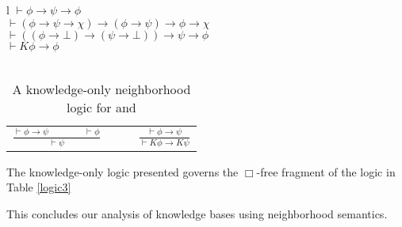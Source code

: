 \begin{table}[h]
  \begin{tabular}{l}
    $\vdash \phi \rightarrow \psi \rightarrow \phi$\\
    $\vdash (\phi \rightarrow \psi \rightarrow \chi) \rightarrow (\phi
    \rightarrow \psi) \rightarrow \phi \rightarrow \chi$\\
    $\vdash ((\phi \rightarrow \bot) \rightarrow (\psi \rightarrow \bot))
    \rightarrow \psi \rightarrow \phi$\\
    $\vdash K \phi \rightarrow \phi$\\
    \\
    \begin{tabular}{llll}
      $\frac{\vdash \phi \rightarrow \psi \hspace{4em} \vdash \phi}{\vdash
      \psi}$ &  &  & $\frac{\vdash \phi \rightarrow \psi}{\vdash K \phi
      \rightarrow K \psi}$
    \end{tabular}
  \end{tabular}
  \caption{\label{logic4}A knowledge-only neighborhood logic for
   and {}}
\end{table}

\begin{proposition}
  The knowledge-only logic presented governs the $\Box$-free fragment of the
  logic in Table \ref{logic3}
\end{proposition}

This concludes our analysis of knowledge bases using neighborhood
semantics.
